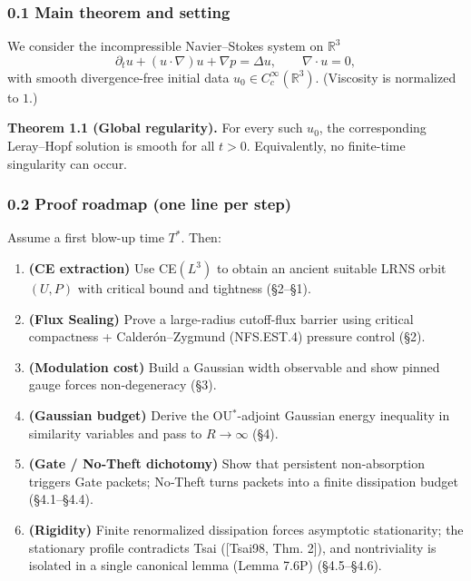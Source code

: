 \documentclass[
  11pt,
]{article}
\providecommand{\tightlist}{%
  \setlength{\itemsep}{0pt}\setlength{\parskip}{0pt}}
\begin{document}
\hypertarget{main-theorem-and-setting}{%
\subsubsection{0.1 Main theorem and setting}\label{main-theorem-and-setting}}

We consider the incompressible Navier--Stokes system on \(\mathbb R^3\) \[
\partial_t u + (u\cdot\nabla)u + \nabla p = \Delta u,\qquad \nabla\cdot u = 0,
\] with smooth divergence-free initial data \(u_0\in C_c^\infty(\mathbb R^3)\). (Viscosity is normalized to \(1\).)

\textbf{Theorem 1.1 (Global regularity).} For every such \(u_0\), the corresponding Leray--Hopf solution is smooth for all \(t>0\). Equivalently, no finite-time singularity can occur.

\hypertarget{proof-roadmap-one-line-per-step}{%
\subsubsection{0.2 Proof roadmap (one line per step)}\label{proof-roadmap-one-line-per-step}}

Assume a first blow-up time \(T^*\). Then:

\begin{enumerate}
\def\labelenumi{\arabic{enumi}.}
\tightlist
\item
  \textbf{(CE extraction)} Use CE\((L^3)\) to obtain an ancient suitable LRNS orbit \((U,P)\) with critical bound and tightness (§2--§1).
\item
  \textbf{(Flux Sealing)} Prove a large-radius cutoff-flux barrier using critical compactness + Calderón--Zygmund (NFS.EST.4) pressure control (§2).
\item
  \textbf{(Modulation cost)} Build a Gaussian width observable and show pinned gauge forces non-degeneracy (§3).
\item
  \textbf{(Gaussian budget)} Derive the OU\(^\ast\)-adjoint Gaussian energy inequality in similarity variables and pass to \(R\to\infty\) (§4).
\item
  \textbf{(Gate / No‑Theft dichotomy)} Show that persistent non-absorption triggers Gate packets; No‑Theft turns packets into a finite dissipation budget (§4.1--§4.4).
\item
  \textbf{(Rigidity)} Finite renormalized dissipation forces asymptotic stationarity; the stationary profile contradicts Tsai ({[}Tsai98, Thm. 2{]}), and nontriviality is isolated in a single canonical lemma (Lemma 7.6P) (§4.5--§4.6).
\end{enumerate}
\end{document}
